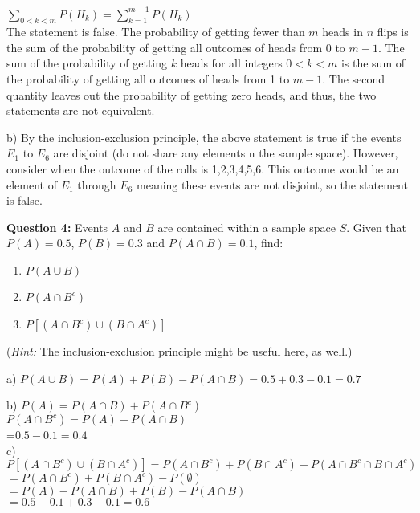 \documentclass[12pt]{article}
\begin{document}
$ \sum_{0 < k<m} P(H_k)= \sum_{k=1}^{m-1} P(H_k)$\\

The statement is false. The probability of getting fewer than $m$ heads in $n$ flips is the sum of the probability of getting all outcomes of heads from 0 to $m-1$. The sum of the probability of getting $k$ heads for all integers $0<k<m$ is the sum of the probability of getting all outcomes of heads from 1 to $m-1$. The second quantity leaves out the probability of getting zero heads, and thus, the two statements are not equivalent.  


\bigskip

b) By the inclusion-exclusion principle, the above statement is true if the events $E_1$ to $E_6$ are disjoint (do not share any elements n the sample space). However, consider when the outcome of the rolls is 1,2,3,4,5,6. This outcome would be an element of $E_1$ through $E_6$ meaning these events are not disjoint, so the statement is false. 
\bigskip

\noindent \textbf{Question 4:} Events $A$ and $B$ are contained within a sample space $S$. Given that $P(A)=0.5$, $P(B)=0.3$ and $P(A \cap B) = 0.1$, find:
\begin{enumerate}
\item $P(A \cup B)$
\item $P(A \cap B^c)$
\item $P[(A \cap B^c) \cup (B \cap A^c)]$
\end{enumerate}
\medskip
(\textit{Hint:} The inclusion-exclusion principle might be useful here, as well.)

\bigskip


a) $P(A \cup B) = P(A) + P(B) - P(A \cap B) = 0.5+0.3 - 0.1 = 0.7$\\
\bigskip


b) $ P(A) = P(A \cap B) + P(A \cap B^c)$ \\
 $ P(A \cap B^c) = P(A) - P(A \cap B)$ \\
 =$ 0.5 - 0.1 = 0.4$ \\

\bigskip
c) $ P[(A \cap B^c) \cup (B \cap A^c)] = P(A \cap B^c) + P(B \cap A^c) - P(A \cap B^c \cap B \cap A^c)$\\
$= P(A \cap B^c) + P(B \cap A^c) - P(\emptyset)$ \\
$= P(A) - P(A\cap B) + P(B) - P(A \cap B)$ \\
$=0.5 - 0.1 + 0.3 - 0.1 = 0.6$ \\
\end{document}
